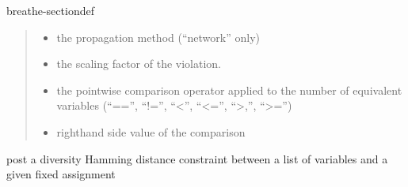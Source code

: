\documentclass[letterpaper,10pt,openany,oneside,english]{sphinxmanual}
\begin{document}
\begin{fulllineitems}
\begin{sphinxuseclass}{breathe-sectiondef}
\begin{fulllineitems}
\begin{quote}
\begin{description}
\begin{itemize}
\item {} 
\sphinxAtStartPar
{} \textendash{} the propagation method (“network” only) 

\item {} 
\sphinxAtStartPar
{} \textendash{} the scaling factor of the violation. 

\item {} 
\sphinxAtStartPar
{} \textendash{} the point\sphinxhyphen{}wise comparison operator applied to the number of equivalent variables (“==”, “!=”, “\textless{}”, “\textless{}=”, “\textgreater{},”, “\textgreater{}=”) 

\item {} 
\sphinxAtStartPar
{} \textendash{} right\sphinxhyphen{}hand side value of the comparison 

\end{itemize}

\end{description}\end{quote}

\end{fulllineitems}


\begin{fulllineitems}
\label{\detokenize{ref/ref_cpp:_CPPv4N11WeightedCSP18postWDivConstraintER6vectorIiEjR6vectorI5ValueEi}}\label{\detokenize{ref/ref_cpp:_CPPv3N11WeightedCSP18postWDivConstraintER6vectorIiEjR6vectorI5ValueEi}}\label{\detokenize{ref/ref_cpp:_CPPv2N11WeightedCSP18postWDivConstraintER6vectorIiEjR6vectorI5ValueEi}}\label{\detokenize{ref/ref_cpp:WeightedCSP::postWDivConstraint__vector:i:R.unsigned-i.vector:Value:R.i}}
\pysigstartsignatures
\pysigstartmultiline
{}
\pysigstopmultiline
\pysigstopsignatures
\sphinxAtStartPar
post a diversity Hamming distance constraint between a list of variables and a given fixed assignment 


\end{fulllineitems}
\end{sphinxuseclass}
\end{fulllineitems}
\end{document}
